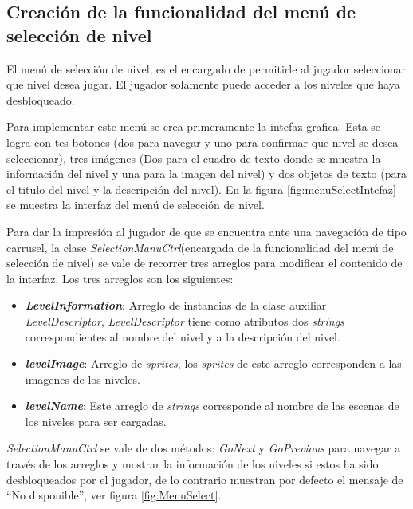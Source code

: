 \subsection{Creación de la funcionalidad del menú de selección de nivel}
El menú de selección de nivel, es el encargado de permitirle al jugador seleccionar 
que nivel desea jugar. El jugador solamente puede acceder a los niveles que haya 
desbloqueado. 
\\
\par
Para implementar este menú se crea primeramente la intefaz grafica. Esta se logra 
con tes botones (dos para navegar y uno para confirmar que nivel se desea 
seleccionar), tres imágenes (Dos para el cuadro de texto donde se muestra la 
información del nivel y una para la imagen del nivel) y dos objetos de texto (para 
el titulo del nivel y la descripción del nivel). En la figura 
\ref{fig:menuSelectIntefaz} se muestra la interfaz del menú de selección de 
nivel. 
\\
\par
Para dar la impresión al jugador de que se encuentra ante una navegación de tipo 
carrusel, la clase \textit{SelectionManuCtrl}(encargada de la funcionalidad del 
menú de selección de nivel) se vale de recorrer tres arreglos para modificar el 
contenido de la interfaz. Los tres arreglos son los siguientes:
\begin{itemize}
	\item \textit{\textbf{LevelInformation}}: Arreglo de instancias de la clase 
	auxiliar \textit{LevelDescriptor}, \textit{LevelDescriptor} tiene como atributos 
	dos \textit{strings} correspondientes al nombre del nivel y a la descripción del 
	nivel.
	\item \textit{\textbf{levelImage}}: Arreglo de \textit{sprites}, los 
	\textit{sprites} de este arreglo corresponden a las imagenes de los niveles.
	\item \textit{\textbf{levelName}}:	Este arreglo de \textit{strings} corresponde 
	al nombre de las escenas de los niveles para ser cargadas.	
\end{itemize}  
\textit{SelectionManuCtrl} se vale de dos métodos: \textit{GoNext} y 
\textit{GoPrevious} para navegar a través de los arreglos y mostrar la información 
de los niveles si estos ha sido desbloqueados por el jugador, de lo contrario 
muestran por defecto el mensaje de “No disponible”, ver figura \ref{fig:MenuSelect}.   

